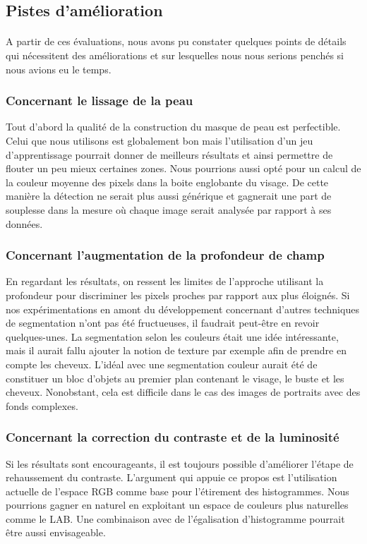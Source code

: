 \documentclass[11pt, french,screen]{report-rd-info}
\begin{document}
\subsection{Pistes d'amélioration}
\paragraph*{}
A partir de ces évaluations, nous avons pu constater quelques points de détails qui nécessitent des améliorations et sur lesquelles nous nous serions penchés si nous avions eu le temps.

\subsubsection{Concernant le lissage de la peau}
Tout d’abord la qualité de la construction du masque de peau est perfectible. Celui que nous utilisons est globalement bon mais l’utilisation d’un jeu d’apprentissage pourrait donner de meilleurs résultats et ainsi permettre de flouter un peu mieux certaines zones. Nous pourrions aussi opté pour un calcul de la couleur moyenne des pixels dans la boite englobante du visage. De cette manière la détection ne serait plus aussi générique et gagnerait une part de 
souplesse dans la mesure où chaque image serait analysée par rapport à ses données.

\subsubsection{Concernant l'augmentation de la profondeur de champ}
En regardant les résultats, on ressent les limites de l'approche utilisant la profondeur pour discriminer les pixels proches par rapport aux plus éloignés. Si nos expérimentations en amont du développement concernant d'autres techniques de segmentation n'ont pas été fructueuses, il faudrait peut-être en revoir quelques-unes. La segmentation selon les couleurs était une idée intéressante, mais il aurait fallu ajouter la notion de texture par exemple afin de prendre en compte les cheveux. L'idéal avec une segmentation couleur aurait été de constituer un bloc d'objets au premier plan contenant le visage, le buste et les cheveux. Nonobstant, cela est difficile dans le cas des images de portraits avec des fonds complexes. 

\subsubsection{Concernant la correction du contraste et de la luminosité}
Si les résultats sont encourageants, il est toujours possible d'améliorer l'étape de rehaussement du contraste. L'argument qui appuie ce propos est l'utilisation actuelle de l'espace RGB comme base pour l'étirement des histogrammes. Nous pourrions gagner en naturel en exploitant un espace de couleurs plus naturelles comme le LAB. Une combinaison avec de l'égalisation d'histogramme pourrait être aussi envisageable.
\end{document}
